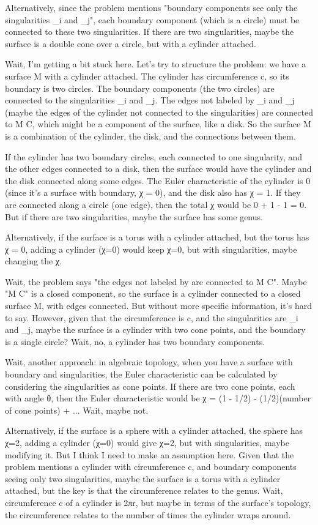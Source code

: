 Alternatively, since the problem mentions "boundary components see only the singularities _i and _j", each boundary component (which is a circle) must be connected to these two singularities. If there are two singularities, maybe the surface is a double cone over a circle, but with a cylinder attached. 

Wait, I'm getting a bit stuck here. Let's try to structure the problem: we have a surface M with a cylinder attached. The cylinder has circumference c, so its boundary is two circles. The boundary components (the two circles) are connected to the singularities _i and _j. The edges not labeled by _i and _j (maybe the edges of the cylinder not connected to the singularities) are connected to M C, which might be a component of the surface, like a disk. So the surface M is a combination of the cylinder, the disk, and the connections between them. 

If the cylinder has two boundary circles, each connected to one singularity, and the other edges connected to a disk, then the surface would have the cylinder and the disk connected along some edges. The Euler characteristic of the cylinder is 0 (since it's a surface with boundary, χ = 0), and the disk also has χ = 1. If they are connected along a circle (one edge), then the total χ would be 0 + 1 - 1 = 0. But if there are two singularities, maybe the surface has some genus. 

Alternatively, if the surface is a torus with a cylinder attached, but the torus has χ = 0, adding a cylinder (χ=0) would keep χ=0, but with singularities, maybe changing the χ. 

Wait, the problem says "the edges not labeled by are connected to M C". Maybe "M C" is a closed component, so the surface is a cylinder connected to a closed surface M, with edges connected. But without more specific information, it's hard to say. However, given that the circumference is c, and the singularities are _i and _j, maybe the surface is a cylinder with two cone points, and the boundary is a single circle? Wait, no, a cylinder has two boundary components. 

Wait, another approach: in algebraic topology, when you have a surface with boundary and singularities, the Euler characteristic can be calculated by considering the singularities as cone points. If there are two cone points, each with angle θ, then the Euler characteristic would be χ = (1 - 1/2) - (1/2)(number of cone points) + ... Wait, maybe not. 

Alternatively, if the surface is a sphere with a cylinder attached, the sphere has χ=2, adding a cylinder (χ=0) would give χ=2, but with singularities, maybe modifying it. But I think I need to make an assumption here. Given that the problem mentions a cylinder with circumference c, and boundary components seeing only two singularities, maybe the surface is a torus with a cylinder attached, but the key is that the circumference relates to the genus. Wait, circumference c of a cylinder is 2πr, but maybe in terms of the surface's topology, the circumference relates to the number of times the cylinder wraps around. 

